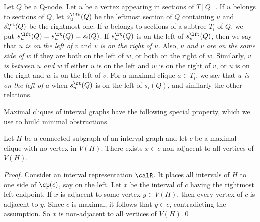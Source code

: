 Let $Q$ be a Q-node. Let $u$ be a vertex appearing in sections of $T[Q]$. If $u$ belongs to sections
of $Q$, let $s_u^\lft(Q)$ be the leftmost section of $Q$ containing $u$ and $s_u^\rt(Q)$ be the
rightmost one. If $u$ belongs to sections of a subtree $T_i$ of $Q$, we put $s_u^\lft(Q) =
s_u^\rt(Q) = s_i(Q)$.  If $s_u^\rt(Q)$ is on the left of $s_v^\lft(Q)$, then we say that \emph{$u$
is on the left of $v$} and \emph{$v$ is on the right of $u$}. Also, \emph{$u$ and $v$ are on the
same side of $w$} if they are both on the left of $w$, or both on the right of $w$. Similarly,
\emph{$v$ is between $u$ and $w$} if either $u$ is on the left and $w$ is on the right of $v$, or
$u$ is on the right and $w$ is on the left of $v$. For a maximal clique $a \in T_i$, we
say that \emph{$u$ is on the left of $a$} when $s_u^\rt(Q)$ is on the left of $s_i(Q)$, and
similarly the other relations.

 Maximal cliques of interval
graphs have the following special property, which we use to build minimal obstructions.

\begin{lemma} \label{lem:non_adjacent}
Let $H$ be a connected subgraph of an interval graph and let $c$ be a maximal clique with no vertex
in $V(H)$. There exists $x \in c$ non-adjacent to all vertices of $V(H)$.
\end{lemma}

\begin{proof}
Consider an interval representation $\calR$. It places all intervals of $H$ to one side of
$\cp(c)$, say on the left. Let $x$ be the interval of $c$ having the rightmost left endpoint. If $x$
is adjacent to some vertex $y \in V(H)$, then every vertex of $c$ is adjacent to $y$.  Since $c$ is
maximal, it follows that $y \in c$, contradicting the assumption. So $x$ is non-adjacent to all
vertices of $V(H)$.\qed
\end{proof}

